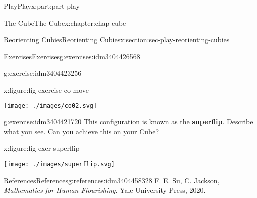 \documentclass[oneside,10pt,]{book}
\newcommand{\terminology}[1]{\textbf{#1}}
\numberwithin{equation}{section}
\begin{document}
\begin{partptx}{Play}{}{Play}{}{}{x:part:part-play}
\begin{chapterptx}{The Cube}{}{The Cube}{}{}{x:chapter:chap-cube}
\begin{sectionptx}{Reorienting Cubies}{}{Reorienting Cubies}{}{}{x:section:sec-play-reorienting-cubies}
\begin{exercises-subsection-numberless}{Exercises}{}{Exercises}{}{}{g:exercises:idm3404426568}
\begin{divisionexercise}{3}{}{}{g:exercise:idm3404423256}
\begin{figureptx}{}{x:figure:fig-exercise-co-move}{}
\begin{image}{0.25}{0.5}{0.25}%
\texttt{[image: ./images/co02.svg]}
\end{image}%
\tcblower
\end{figureptx}%
\end{divisionexercise}%
\begin{divisionexercise}{4}{}{}{g:exercise:idm3404421720}%
This configuration is known as the \terminology{superflip}. Describe what you see. Can you achieve this on your Cube?%
\begin{figureptx}{}{x:figure:fig-exer-superflip}{}%
\begin{image}{0.25}{0.5}{0.25}%
\texttt{[image: ./images/superflip.svg]}
\end{image}%
\tcblower
\end{figureptx}%
\end{divisionexercise}%
\end{exercises-subsection-numberless}
\end{sectionptx}
%
%
\typeout{************************************************}
\typeout{************************************************}
%
\begin{references-section}{References}{}{References}{}{}{g:references:idm3404458328}
F. E. Su, C. Jackson, \emph{Mathematics for Human Flourishing}. Yale University Press, 2020.\end{references-section}
\end{chapterptx}
 \end{partptx}
%
%
\typeout{************************************************}
\typeout{************************************************}
%
\end{document}
